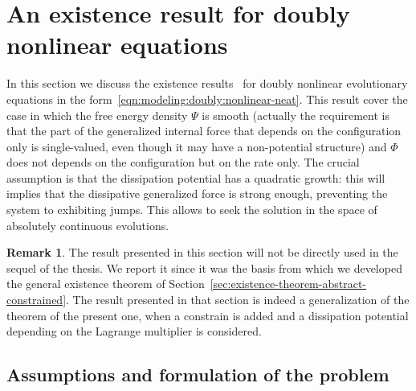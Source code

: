 \documentclass[a4paper,10pt,twoside]{amsbook}
\numberwithin{section}{chapter}
\numberwithin{equation}{chapter}
\theoremstyle{definition}
\newtheorem{rmk}[prop]{Remark}
\begin{document}
\section{An existence result for doubly nonlinear equations}
\label{sec:roubickeck}

In this section we discuss the existence results~\cite[Proposition 11.1]{roubicek-pde} for doubly nonlinear evolutionary equations in the form~\eqref{eqn:modeling:doubly:nonlinear-neat}. This result cover the case in which the free energy density $\Psi$ is smooth (actually the requirement is that the part of the generalized internal force that depends on the configuration only is single-valued, even though it may have a non-potential structure) and $\Phi$ does not depends on the configuration but on the rate only. The crucial assumption is that the dissipation potential has a quadratic growth: this will implies that the dissipative generalized force is strong enough, preventing the system to exhibiting jumps. This allows to seek the solution in the space of absolutely continuous evolutions.

\begin{rmk}
The result presented in this section will not be directly used in the sequel of the thesis. We report it since it was the basis from which we developed the general existence theorem of Section~\ref{sec:existence-theorem-abstract-constrained}. The result presented in that section is indeed a generalization of the theorem of the present one, when a constrain is added and a dissipation potential depending on the Lagrange multiplier is considered.
\end{rmk}

\subsection{Assumptions and formulation of the problem}
\end{document}
